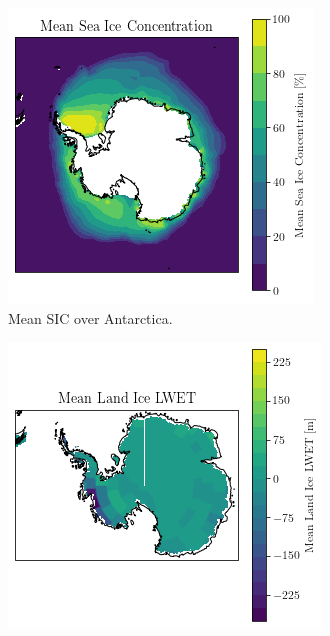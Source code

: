 \documentclass[../main.tex]{subfiles}
\begin{document}
\begin{figure}[H]
\centering
\begin{subfigure}[h!]{0.49\textwidth}
\includegraphics[width=\textwidth]{images/week8/lres/mean_sic_distribution}
\caption{Mean SIC over Antarctica.}
\end{subfigure}
\begin{subfigure}[h!]{0.49\textwidth}
\includegraphics[width=\textwidth]{images/week8/lres/mean_lic_distribution}

\end{subfigure}
\end{figure}
\end{document}
